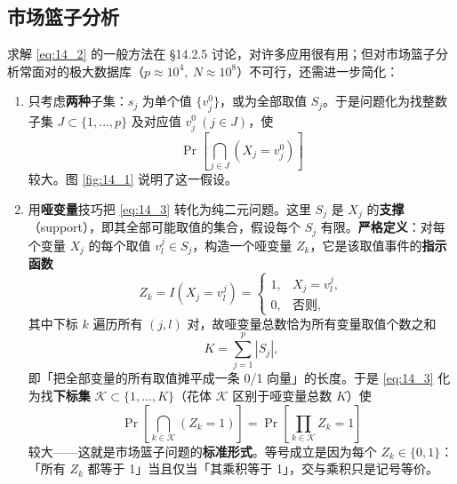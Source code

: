 \subsection{市场篮子分析}

求解 \eqref{eq:14_2} 的一般方法在 §14.2.5 讨论，对许多应用很有用；但对市场篮子分析常面对的极大数据库（$p\approx 10^4,\ N\approx 10^8$）不可行，还需进一步简化：

\begin{enumerate}[itemsep=1pt]
\item 只考虑\textbf{两种}子集：$s_j$ 为单个值 $\{v_j^0\}$，或为全部取值 $S_j$。于是问题化为找整数子集 $J\subset\{1,\dots,p\}$ 及对应值 $v_j^0\ (j\in J)$，使
\begin{equation}
\Pr\left[\bigcap_{j\in J} (X_j = v_j^0)\right] \label{eq:14_3}
\end{equation}
较大。图 \ref{fig:14_1} 说明了这一假设。
\item 用\textbf{哑变量}技巧把 \eqref{eq:14_3} 转化为纯二元问题。这里 $S_j$ 是 $X_j$ 的\textbf{支撑}（support），即其全部可能取值的集合，假设每个 $S_j$ 有限。\textbf{严格定义}：对每个变量 $X_j$ 的每个取值 $v_l^j\in S_j$，构造一个哑变量 $Z_k$，它是该取值事件的\textbf{指示函数}
\[
Z_k = I(X_j = v_l^j) = \begin{cases} 1, & X_j = v_l^j,\\ 0, & \text{否则}, \end{cases}
\]
其中下标 $k$ 遍历所有 $(j,l)$ 对，故哑变量总数恰为所有变量取值个数之和
\[
K = \sum_{j=1}^{p} |S_j|,
\]
即「把全部变量的所有取值摊平成一条 0/1 向量」的长度。于是 \eqref{eq:14_3} 化为找\textbf{下标集} $\mathcal{K}\subset\{1,\dots,K\}$（花体 $\mathcal{K}$ 区别于哑变量总数 $K$）使
\begin{equation}
\Pr\left[\bigcap_{k\in\mathcal{K}} (Z_k=1)\right] = \Pr\left[\prod_{k\in\mathcal{K}} Z_k = 1\right] \label{eq:14_4}
\end{equation}
较大——这就是市场篮子问题的\textbf{标准形式}。等号成立是因为每个 $Z_k\in\{0,1\}$：「所有 $Z_k$ 都等于 1」当且仅当「其乘积等于 1」，交与乘积只是记号等价。
\end{enumerate}

